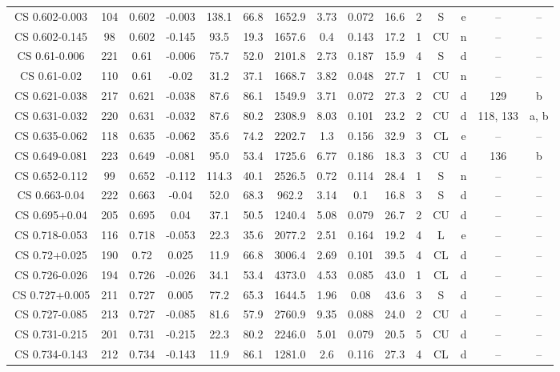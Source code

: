 \begin{table}
\begin{tabular}{ccccccccccccccc}
CS 0.602-0.003 & 104 & 0.602 & -0.003 & 138.1 & 66.8 & 1652.9 & 3.73 & 0.072 & 16.6 & 2 & S & e & -- & -- \\
CS 0.602-0.145 & 98 & 0.602 & -0.145 & 93.5 & 19.3 & 1657.6 & 0.4 & 0.143 & 17.2 & 1 & CU & n & -- & -- \\
CS 0.61-0.006 & 221 & 0.61 & -0.006 & 75.7 & 52.0 & 2101.8 & 2.73 & 0.187 & 15.9 & 4 & S & d & -- & -- \\
CS 0.61-0.02 & 110 & 0.61 & -0.02 & 31.2 & 37.1 & 1668.7 & 3.82 & 0.048 & 27.7 & 1 & CU & n & -- & -- \\
CS 0.621-0.038 & 217 & 0.621 & -0.038 & 87.6 & 86.1 & 1549.9 & 3.71 & 0.072 & 27.3 & 2 & CU & d & 129 & b \\
CS 0.631-0.032 & 220 & 0.631 & -0.032 & 87.6 & 80.2 & 2308.9 & 8.03 & 0.101 & 23.2 & 2 & CU & d & 118, 133 & a, b \\
CS 0.635-0.062 & 118 & 0.635 & -0.062 & 35.6 & 74.2 & 2202.7 & 1.3 & 0.156 & 32.9 & 3 & CL & e & -- & -- \\
CS 0.649-0.081 & 223 & 0.649 & -0.081 & 95.0 & 53.4 & 1725.6 & 6.77 & 0.186 & 18.3 & 3 & CU & d & 136 & b \\
CS 0.652-0.112 & 99 & 0.652 & -0.112 & 114.3 & 40.1 & 2526.5 & 0.72 & 0.114 & 28.4 & 1 & S & n & -- & -- \\
CS 0.663-0.04 & 222 & 0.663 & -0.04 & 52.0 & 68.3 & 962.2 & 3.14 & 0.1 & 16.8 & 3 & S & d & -- & -- \\
CS 0.695+0.04 & 205 & 0.695 & 0.04 & 37.1 & 50.5 & 1240.4 & 5.08 & 0.079 & 26.7 & 2 & CU & d & -- & -- \\
CS 0.718-0.053 & 116 & 0.718 & -0.053 & 22.3 & 35.6 & 2077.2 & 2.51 & 0.164 & 19.2 & 4 & L & e & -- & -- \\
CS 0.72+0.025 & 190 & 0.72 & 0.025 & 11.9 & 66.8 & 3006.4 & 2.69 & 0.101 & 39.5 & 4 & CL & d & -- & -- \\
CS 0.726-0.026 & 194 & 0.726 & -0.026 & 34.1 & 53.4 & 4373.0 & 4.53 & 0.085 & 43.0 & 1 & CL & d & -- & -- \\
CS 0.727+0.005 & 211 & 0.727 & 0.005 & 77.2 & 65.3 & 1644.5 & 1.96 & 0.08 & 43.6 & 3 & S & d & -- & -- \\
CS 0.727-0.085 & 213 & 0.727 & -0.085 & 81.6 & 57.9 & 2760.9 & 9.35 & 0.088 & 24.0 & 2 & CU & d & -- & -- \\
CS 0.731-0.215 & 201 & 0.731 & -0.215 & 22.3 & 80.2 & 2246.0 & 5.01 & 0.079 & 20.5 & 5 & CU & d & -- & -- \\
CS 0.734-0.143 & 212 & 0.734 & -0.143 & 11.9 & 86.1 & 1281.0 & 2.6 & 0.116 & 27.3 & 4 & CL & d & -- & -- \\

\end{tabular}
\end{table}
